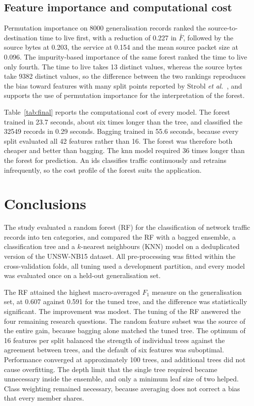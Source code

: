\subsection{Feature importance and computational cost}
\label{sec:res-cost}

Permutation importance on 8000 generalisation records ranked the
source-to-destination time to live first, with a reduction of 0.227 in
$\bar{F}$, followed by the source bytes at 0.203, the service at 0.154 and
the mean source packet size at 0.096. The impurity-based importance of the
same forest ranked the time to live only fourth. The time to live takes 13
distinct values, whereas the source bytes take 9382 distinct values, so the
difference between the two rankings reproduces the bias toward features
with many split points reported by Strobl
\textit{et al.}~\cite{strobl2007}, and supports the use of permutation
importance for the interpretation of the forest.

Table~\ref{tab:final} reports the computational cost of every model. The
forest trained in 23.7 seconds, about six times longer than the tree, and
classified the \num{32549} records in 0.29 seconds. Bagging trained in 55.6
seconds, because every split evaluated all 42 features rather than 16. The
forest was therefore both cheaper and better than bagging. The \gls{knn}
model required 36 times longer than the forest for prediction. An \gls{ids}
classifies traffic continuously and retrains infrequently, so the cost
profile of the forest suits the application.

\section{Conclusions}
\label{sec:conclusion}

The study evaluated a random forest (RF) for the classification of network
traffic records into ten categories, and compared the RF with a bagged
ensemble, a classification tree and a $k$-nearest neighbours (KNN) model on
a deduplicated version of the UNSW-NB15 dataset. All pre-processing was
fitted within the cross-validation folds, all tuning used a development
partition, and every model was evaluated once on a held-out generalisation
set.

The RF attained the highest macro-averaged $F_1$ measure on the
generalisation set, at 0.607 against 0.591 for the tuned tree, and the
difference was statistically significant. The improvement was modest. The
tuning of the RF answered the four remaining research questions. The
random feature subset was the source of the entire gain, because bagging
alone matched the tuned tree. The optimum of 16 features per split balanced
the strength of individual trees against the agreement between trees, and
the default of six features was suboptimal. Performance converged
at approximately 100 trees, and additional trees did not cause overfitting.
The depth limit that the single tree required became unnecessary inside the
ensemble, and only a minimum leaf size of two helped. Class weighting
remained necessary, because averaging does not correct a bias that every
member shares.

